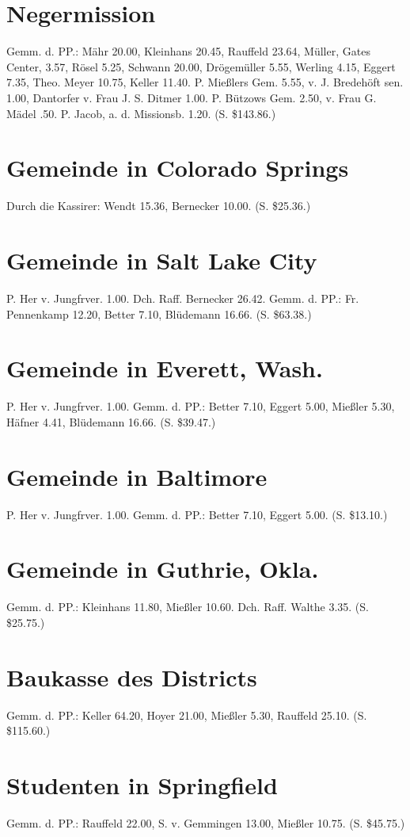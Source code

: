 \section{Negermission}
Gemm. d. PP.: Mähr 20.00, Kleinhans 20.45, Rauffeld 23.64, Müller, Gates Center, 3.57, Rösel 5.25, Schwann 20.00, Drögemüller 5.55, Werling 4.15, Eggert 7.35, Theo. Meyer 10.75, Keller 11.40. P. Mießlers Gem. 5.55, v. J. Bredehöft sen. 1.00, Dantorfer v. Frau J. S. Ditmer 1.00. P. Bützows Gem. 2.50, v. Frau G. Mädel .50. P. Jacob, a. d. Missionsb. 1.20. (S. \$143.86.)

\section{Gemeinde in Colorado Springs}
Durch die Kassirer: Wendt 15.36, Bernecker 10.00. (S. \$25.36.)

\section{Gemeinde in Salt Lake City}
P. Her v. Jungfrver. 1.00. Dch. Raff. Bernecker 26.42. Gemm. d. PP.: Fr. Pennenkamp 12.20, Better 7.10, Blüdemann 16.66. (S. \$63.38.)

\section{Gemeinde in Everett, Wash.}
P. Her v. Jungfrver. 1.00. Gemm. d. PP.: Better 7.10, Eggert 5.00, Mießler 5.30, Häfner 4.41, Blüdemann 16.66. (S. \$39.47.)

\section{Gemeinde in Baltimore}
P. Her v. Jungfrver. 1.00. Gemm. d. PP.: Better 7.10, Eggert 5.00. (S. \$13.10.)

\section{Gemeinde in Guthrie, Okla.}
Gemm. d. PP.: Kleinhans 11.80, Mießler 10.60. Dch. Raff. Walthe 3.35. (S. \$25.75.)

\section{Baukasse des Districts}
Gemm. d. PP.: Keller 64.20, Hoyer 21.00, Mießler 5.30, Rauffeld 25.10. (S. \$115.60.)

\section{Studenten in Springfield}
Gemm. d. PP.: Rauffeld 22.00, S. v. Gemmingen 13.00, Mießler 10.75. (S. \$45.75.)

